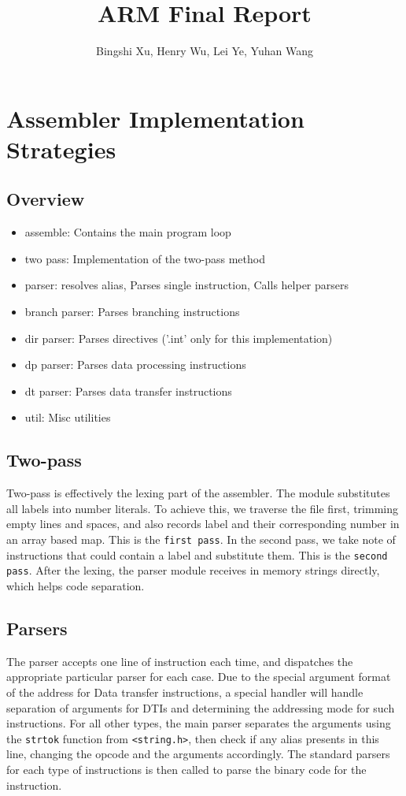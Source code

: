 \documentclass[11pt]{article}
\begin{document}
\title{ARM Final Report}
\author{Bingshi Xu, Henry Wu, Lei Ye, Yuhan Wang}

\maketitle

\section{Assembler Implementation Strategies}

\subsection{Overview}
\begin{itemize}
	\item assemble: Contains the main program loop
	\item two pass: Implementation of the two-pass method
	\item parser: resolves alias, Parses single instruction, Calls helper parsers
	\item branch parser: Parses branching instructions
	\item dir parser: Parses directives ('.int' only for this implementation)
	\item dp parser: Parses data processing instructions
	\item dt parser: Parses data transfer instructions
	\item util: Misc utilities
\end{itemize}

\subsection{Two-pass}
Two-pass is effectively the lexing part of the assembler. The module
substitutes all labels into number literals. To achieve this, we traverse the
file first, trimming empty lines and spaces, and also records label and their
corresponding number in an array based map. This is the \texttt{first pass}. In
the second pass, we take note of instructions that could contain a label and
substitute them. This is the \texttt{second pass}. After the lexing, the parser
module receives in memory strings directly, which helps code separation.

\subsection{Parsers}
The parser accepts one line of instruction each time, and dispatches the
appropriate particular parser for each case. Due to the special argument format
of the address for Data transfer instructions, a special handler will handle
separation of arguments for DTIs and determining the addressing mode for such
instructions. For all other types, the main parser separates the arguments
using the \texttt{strtok} function from \texttt{<string.h>}, then check if any
alias presents in this line, changing the opcode and the arguments accordingly.
The standard parsers for each type of instructions is then called to parse the
binary code for the instruction.
\end{document}
